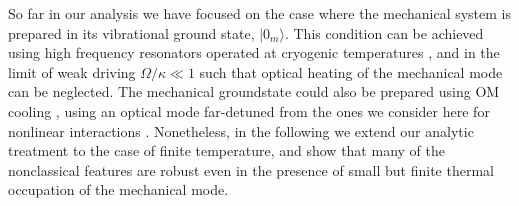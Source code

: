 So far in our analysis
we have focused on the case where the mechanical
system is prepared in its vibrational 
ground state, $|0_m\rangle$. 
This
condition can be achieved using high frequency resonators 
operated at cryogenic
temperatures \cite{O'Connell2010}, 
and in the limit of weak driving $\Omega/\kappa\ll1$ such
that optical
heating of the mechanical mode can be neglected. 
The mechanical groundstate  could also be 
prepared using OM cooling \cite{Metzger2004, Gigan2006, 
Arcizet2006, Kleckner2006, Corbitt2007, 
Schliesser2008,Thompson2008,Wilson2009,
O'Connell2010,Teufel2011,Chan2011},
using an optical mode far-detuned
from the ones we consider  here for 
nonlinear interactions
\cite{Stannigel2012}.
Nonetheless,
in the
following we extend our analytic treatment to the case of finite temperature, 
and show that many of the
nonclassical features are robust even
in the presence of small
but finite thermal occupation of the mechanical mode.


